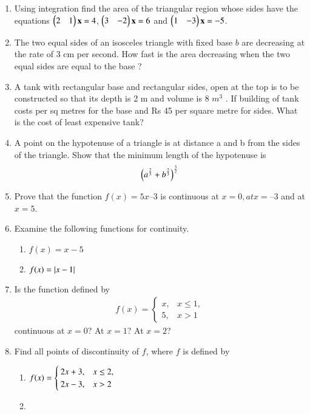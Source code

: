 \begin{enumerate}[label=\arabic*.,ref=\thesubsection.\theenumi]
\item  Using integration find the area of the triangular region whose sides have the equations $\begin{pmatrix}2 & 1 \end{pmatrix}\mathbf{x} = 4$, $\begin{pmatrix}3 & -2 \end{pmatrix}\mathbf{x} = 6$ and  $\begin{pmatrix}1 & -3 \end{pmatrix}\mathbf{x} = -5$.
\item The two equal sides of an isosceles triangle with fixed base $b$ are decreasing at the rate of 3 cm per second. How fast is the area decreasing when the two equal sides are equal to the base ?
\item A tank with rectangular base and rectangular sides, open at the top is to be constructed so that its depth is 2 m and volume is 8 $m^3$
. If building of tank costs
 per sq metres for the base and Rs 45 per square metre for sides. What is the cost of least expensive tank?
\item A point on the hypotenuse of a triangle is at distance a and b from the sides of the triangle.
Show that the minimum length of the hypotenuse is
%
\begin{align}
\left(a^{\frac{2}{3}}+b^{\frac{2}{3}}\right)^{\frac{3}{2}}
\end{align}
%
\item Prove that the function $f(x) = 5x – 3$ is continuous at $x = 0, at x = – 3$ and at $x = 5$.
\item Examine the following functions for continuity.
%
\begin{enumerate}
\item $f(x) = x-5$
\item $f(x) = \left\vert x-1\right\vert$
\end{enumerate}
%
\item Is the function defined by 
%
\begin{align}
f(x)=
\begin{cases}
x, & x \le 1,
\\
5, & x > 1
\end{cases}
\end{align}
%
continuous at $x = 0$? At $x = 1$? At $x = 2$?
\item Find all points of discontinuity of $f$, where $f$ is defined by
%
\begin{enumerate}
\item 
$
\begin{alignedat}[t]{2}
f(x)=
\begin{cases}
2x+3, & x \le 2,
\\
2x-3, & x > 2
\end{cases}
\end{alignedat}
$
%
\item 

\end{enumerate}
\end{enumerate}
